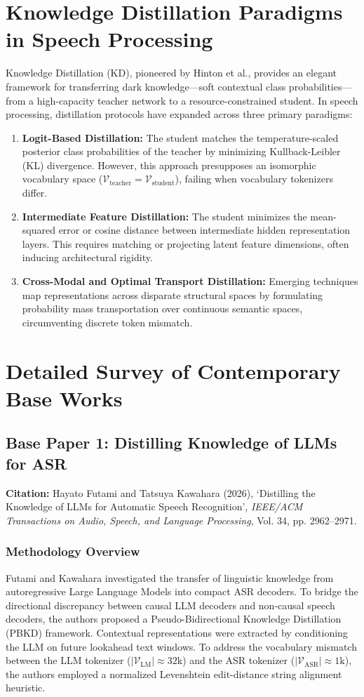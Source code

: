\section{Knowledge Distillation Paradigms in Speech Processing}
Knowledge Distillation (KD), pioneered by Hinton et al., provides an elegant framework for transferring dark knowledge—soft contextual class probabilities—from a high-capacity teacher network to a resource-constrained student. In speech processing, distillation protocols have expanded across three primary paradigms:
\begin{enumerate}
    \item \textbf{Logit-Based Distillation:} The student matches the temperature-scaled posterior class probabilities of the teacher by minimizing Kullback-Leibler (KL) divergence. However, this approach presupposes an isomorphic vocabulary space ($\mathcal{V}_{\text{teacher}} = \mathcal{V}_{\text{student}}$), failing when vocabulary tokenizers differ.
    \item \textbf{Intermediate Feature Distillation:} The student minimizes the mean-squared error or cosine distance between intermediate hidden representation layers. This requires matching or projecting latent feature dimensions, often inducing architectural rigidity.
    \item \textbf{Cross-Modal and Optimal Transport Distillation:} Emerging techniques map representations across disparate structural spaces by formulating probability mass transportation over continuous semantic spaces, circumventing discrete token mismatch.
\end{enumerate}

\section{Detailed Survey of Contemporary Base Works}

\subsection{Base Paper 1: Distilling Knowledge of LLMs for ASR}
\textbf{Citation:} Hayato Futami and Tatsuya Kawahara (2026), `Distilling the Knowledge of LLMs for Automatic Speech Recognition', \textit{IEEE/ACM Transactions on Audio, Speech, and Language Processing}, Vol. 34, pp. 2962--2971.

\subsubsection{Methodology Overview}
Futami and Kawahara investigated the transfer of linguistic knowledge from autoregressive Large Language Models into compact ASR decoders. To bridge the directional discrepancy between causal LLM decoders and non-causal speech decoders, the authors proposed a Pseudo-Bidirectional Knowledge Distillation (PBKD) framework. Contextual representations were extracted by conditioning the LLM on future lookahead text windows. To address the vocabulary mismatch between the LLM tokenizer ($|\mathcal{V}_{\text{LM}}| \approx 32\text{k}$) and the ASR tokenizer ($|\mathcal{V}_{\text{ASR}}| \approx 1\text{k}$), the authors employed a normalized Levenshtein edit-distance string alignment heuristic.

